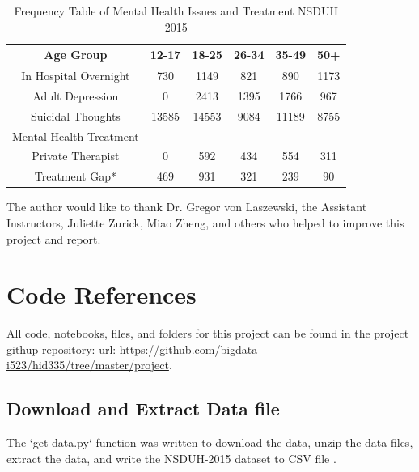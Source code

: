 \documentclass[sigconf]{acmart}
\begin{document}
\begin{table}
  \caption{Frequency Table of Mental Health Issues and Treatment NSDUH 2015
  \cite{samhsa16}}
  \label{tab:freq}
  \begin{tabular}{cccccc}
    \toprule
    Age Group & 12-17& 18-25& 26-34& 35-49& 50+\\
    \midrule
    In Hospital Overnight& 730& 1149& 821& 890& 1173 \\
    Adult Depression& 0& 2413& 1395& 1766& 967 \\
    Suicidal Thoughts& 13585& 14553& 9084& 11189& 8755 \\
    \midrule
    Mental Health Treatment& & & & & \\
    \midrule
    Private Therapist& 0& 592& 434& 554& 311 \\
    Treatment Gap*& 469& 931& 321& 239& 90 \\
    \bottomrule
  \end{tabular}
\end{table}



\begin{acks}

  The author would like to thank Dr. Gregor von Laszewski, 
  the Assistant Instructors, Juliette Zurick, Miao Zheng,
  and others who helped to improve this project and report.

\end{acks}


 


\appendix



\section{Code References}

All code, notebooks, files, and folders for this project can be found in the
project githup repository: \url{url:  https://github.com/bigdata-i523/hid335/tree/master/project}.

\subsection{Download and Extract Data file \cite{getdata17}}

The `get-data.py` function was written to download the data, unzip the data
files, extract the data, and write the NSDUH-2015 dataset to CSV file 
\cite{getdata17}.
\end{document}

